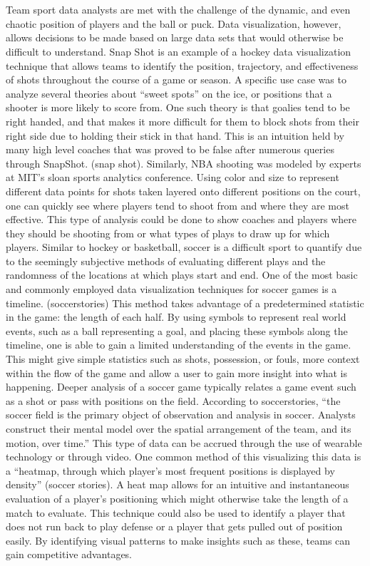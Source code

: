 \documentclass[sigconf]{acmart}
\begin{document}
\section{}Team sport data analysts are met with the challenge of the dynamic, and even chaotic position of players and the ball or puck. Data visualization, however, allows decisions to be made based on large data sets that would otherwise be difficult to understand. Snap Shot is an example of a hockey data visualization technique that allows teams to identify the position, trajectory, and effectiveness of shots throughout the course of a game or season. A specific use case was to analyze several theories about “sweet spots” on the ice, or positions that a shooter is more likely to score from. One such theory is that goalies tend to be right handed, and that makes it more difficult for them to block shots from their right side due to holding their stick in that hand. This is an intuition held by many high level coaches that was proved to be false after numerous queries through SnapShot. (snap shot). Similarly, NBA shooting was modeled by experts at MIT’s sloan sports analytics conference. Using color and size to represent different data points for shots taken layered onto different positions on the court, one can quickly see where players tend to shoot from and where they are most effective. This type of analysis could be done to show coaches and players where they should be shooting from or what types of plays to draw up for which players.
	Similar to hockey or basketball, soccer is a difficult sport to quantify due to the seemingly subjective methods of evaluating different plays and the randomness of the locations at which plays start and end. One of the most basic and commonly employed data visualization techniques for soccer games is a timeline. (soccerstories) This method takes advantage of a predetermined statistic in the game: the length of each half. By using symbols to represent real world events, such as a ball representing a goal, and placing these symbols along the timeline, one is able to gain a limited understanding of the events in the game. This might give simple statistics such as shots, possession, or fouls, more context within the flow of the game and allow a user to gain more insight into what is happening. 
	Deeper analysis of a soccer game typically relates a game event such as a shot or pass with positions on the field. According to soccerstories, “the soccer field is the primary object of observation and analysis in soccer. Analysts construct their mental model over the spatial arrangement of the team, and its motion, over time.” This type of data can be accrued through the use of wearable technology or through video. One common method of this visualizing this data is a “heatmap, through which player's most frequent positions is displayed by density” (soccer stories). A heat map allows for an intuitive and instantaneous evaluation of a player’s positioning which might otherwise take the length of a match to evaluate. This technique could also be used to identify a player that does not run back to play defense or a player that gets pulled out of position easily. By identifying visual patterns to make insights such as these, teams can gain competitive advantages.
\end{document}

